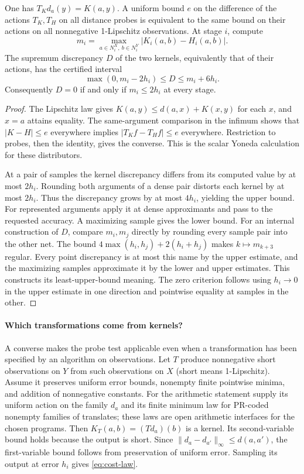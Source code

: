\begin{theorem}\label{thm:probe}
One has \(T_Kd_a(y)=K(a,y)\). A uniform bound \(e\) on the difference of the actions \(T_K,T_H\) on all distance probes is equivalent to the same bound on their actions on all nonnegative 1-Lipschitz observations. At stage \(i\), compute
\[
 m_i=\max_{a\in N_i^X,\ b\in N_i^Y}|K_i(a,b)-H_i(a,b)|.
\]
The supremum discrepancy \(D\) of the two kernels, equivalently that of their actions, has the certified interval
\begin{equation}
 \max(0,m_i-2h_i)\le D\le m_i+6h_i. \label{eq:probe-distance}
\end{equation}
Consequently \(D=0\) if and only if \(m_i\le2h_i\) at every stage.
\end{theorem}
\begin{proof}
The Lipschitz law gives \(K(a,y)\le d(a,x)+K(x,y)\) for each \(x\), and \(x=a\) attains equality. The same-argument comparison in the infimum shows that \(|K-H|\le e\) everywhere implies \(|T_K f-T_H f|\le e\) everywhere. Restriction to probes, then the identity, gives the converse. This is the scalar Yoneda calculation for these distributors.

At a pair of samples the kernel discrepancy differs from its computed value by at most \(2h_i\). Rounding both arguments of a dense pair distorts each kernel by at most \(2h_i\). Thus the discrepancy grows by at most \(4h_i\), yielding the upper bound. For represented arguments apply it at dense approximants and pass to the requested accuracy. A maximizing sample gives the lower bound. For an internal construction of \(D\), compare \(m_i,m_j\) directly by rounding every sample pair into the other net. The bound \(4\max(h_i,h_j)+2(h_i+h_j)\) makes \(k\mapsto m_{k+3}\) regular. Every point discrepancy is at most this name by the upper estimate, and the maximizing samples approximate it by the lower and upper estimates. This constructs its least-upper-bound meaning. The zero criterion follows using \(h_i\to0\) in the upper estimate in one direction and pointwise equality at samples in the other.
\end{proof}

\paragraph{Which transformations come from kernels?}
A converse makes the probe test applicable even when a transformation has been specified by an algorithm on observations. Let \(T\) produce nonnegative short observations on \(Y\) from such observations on \(X\) (short means 1-Lipschitz). Assume it preserves uniform error bounds, nonempty finite pointwise minima, and addition of nonnegative constants. For the arithmetic statement supply its uniform action on the family \(d_a\) and its finite minimum law for PR-coded nonempty families of translates; these laws are open arithmetic interfaces for the chosen programs. Then \(K_T(a,b)=(T d_a)(b)\) is a kernel. Its second-variable bound holds because the output is short. Since \(\|d_a-d_{a'}\|_\infty\le d(a,a')\), the first-variable bound follows from preservation of uniform error. Sampling its output at error \(h_i\) gives \eqref{eq:cost-law}.

